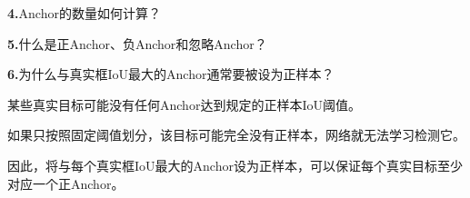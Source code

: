 \documentclass[UTF8,openany,oneside,zihao=-4,fontset=windows]{ctexbook}
\newif\ifshowsolutions
\newcommand{\Question}[2]{%
  \par\Needspace{4\baselineskip}\medskip
  \noindent\textbf{\color{MVBlue}#1}\quad #2\par
}
\newenvironment{AnswerBox}{\begin{tcolorbox}[breakable,colback=MVLight,colframe=MVBlue!45,title={参考答案},fonttitle=\bfseries,boxrule=0.55pt,arc=1.5mm,left=2mm,right=2mm,top=1.5mm,bottom=1.5mm]}{\end{tcolorbox}}
\newcommand{\PracticeSpace}[1]{\ifshowsolutions\else\par\vspace{#1}\par\fi}
\begin{document}
\else
\PracticeSpace{2.4cm}
\fi
\Question{4.}{Anchor的数量如何计算？}
\ifshowsolutions
\begin{AnswerBox}
\par\noindent\textbf{若特征图大小为：}
\par H×W
\par\noindent\textbf{每个位置设置：}
\par\noindent\textbullet\quad S 种尺度；
\par R 种长宽比。
\par\noindent\textbf{则每个位置的Anchor数为：}
\par k=S×R
\par\noindent\textbf{总Anchor数为：}
\par H×W×k
\end{AnswerBox}
\else
\PracticeSpace{2.4cm}
\fi
\Question{5.}{什么是正Anchor、负Anchor和忽略Anchor？}
\ifshowsolutions
\begin{AnswerBox}
\par 通常根据Anchor与真实框的IoU划分。
\par 正Anchor
\par\noindent\textbf{满足以下情况之一：}
\par\noindent\textbullet\quad 与某个真实框的IoU高于正样本阈值；
\par 是与某个真实框IoU最大的Anchor。
\par\noindent\textbf{正Anchor用于学习：}
\par\noindent\textbullet\quad 前景分类；
\par 边界框回归。
\par 负Anchor
\par 与所有真实框的IoU都较低，视为背景，只参与前景、背景分类。
\par 忽略Anchor
\par IoU处于正负阈值之间，不参与当前损失计算，避免模糊样本干扰训练。
\par 具体阈值可能因实现而不同。
\end{AnswerBox}
\else
\PracticeSpace{2.4cm}
\fi
\Question{6.}{为什么与真实框IoU最大的Anchor通常要被设为正样本？}
\ifshowsolutions
\begin{AnswerBox}
\par 某些真实目标可能没有任何Anchor达到规定的正样本IoU阈值。
\par 如果只按照固定阈值划分，该目标可能完全没有正样本，网络就无法学习检测它。
\par 因此，将与每个真实框IoU最大的Anchor设为正样本，可以保证每个真实目标至少对应一个正Anchor。
\end{AnswerBox}
\end{document}

